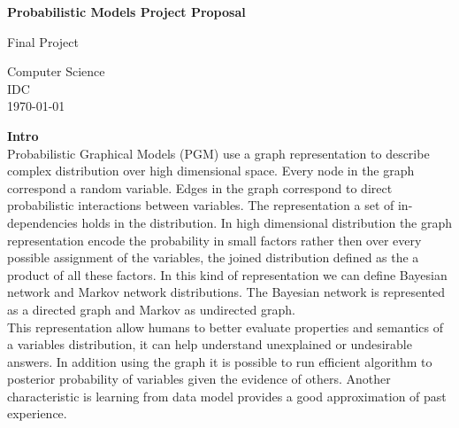 \documentclass{article}
\begin{document}
    \begin{titlepage}
        \begin{center}
            \vspace*{1cm}
            
            \textbf{Probabilistic Models Project Proposal}
            
            \vspace{0.5cm}
            
            
            \vspace{1.5cm}
            
            \vfill
            
            Final Project\\
            
            \vspace{0.8cm}
            
            
            
            Computer Science\\
            IDC\\
            \today
            
        \end{center}
    \end{titlepage}
    \textbf{Intro}\\
    Probabilistic Graphical Models (PGM) use a graph representation to describe complex distribution over high dimensional space. Every node in the graph correspond a random variable. Edges in the graph correspond to direct probabilistic interactions between variables. The representation a set of in-dependencies holds in the distribution.
    In high dimensional distribution the graph representation encode the probability in small factors rather then over every possible assignment of the variables, the joined distribution defined as the a product of all these factors. In this kind of representation we can define Bayesian network and Markov network distributions. The Bayesian network is represented as a directed graph and Markov as undirected graph.\\
    This representation allow humans to better evaluate properties and semantics of a variables distribution, it can help understand unexplained or undesirable answers. In addition using the graph it is possible to run efficient algorithm to posterior probability of variables given the evidence of others. Another characteristic is learning from data model provides a good approximation of past experience.\\~\\
\end{document}
